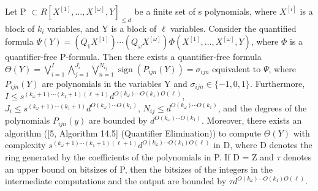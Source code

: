 Let P \(\subset R[X^{[1]},\ldots,X^{[\omega]},Y]_{\le d}\) be a finite set of s polynomials, where \(X^{[i]}\) is a block of \(k_i\) variables, and Y is a block of \(\ell\) variables. Consider the quantified formula \(\Psi(Y)=(Q_1X^{[1]})\cdots(Q_\omega X^{[\omega]})\Phi(X^{[1]},\ldots,X^{[\omega]},Y)\), where \(\Phi\) is a quantifier-free P-formula. Then there exists a quantifier-free formula \(\Theta(Y)=\bigvee_{i=1}^{I}\bigwedge_{j=1}^{J_i}\bigvee_{n=1}^{N_{ij}}\operatorname{sign}(P_{ijn}(Y))=\sigma_{ijn}\) equivalent to \(\Psi\), where \(P_{ijn}(Y)\) are polynomials in the variables Y and \(\sigma_{ijn}\in\{-1,0,1\}\). Furthermore, \(I\le s^{(k_\omega+1)\cdots(k_1+1)(\ell+1)}d^{O(k_\omega)\cdots O(k_1)O(\ell)}\), \(J_i\le s^{(k_\omega+1)\cdots(k_1+1)}d^{O(k_\omega)\cdots O(k_1)}\), \(N_{ij}\le d^{O(k_\omega)\cdots O(k_1)}\), and the degrees of the polynomials \(P_{ijn}(y)\) are bounded by \(d^{O(k_\omega)\cdots O(k_1)}\). Moreover, there exists an algorithm ([5, Algorithm 14.5] (Quantifier Elimination)) to compute \(\Theta(Y)\) with complexity \(s^{(k_\omega+1)\cdots(k_1+1)(\ell+1)}d^{O(k_\omega)\cdots O(k_1)O(\ell)}\) in D, where D denotes the ring generated by the coefficients of the polynomials in P. If D = Z and \(\tau\) denotes an upper bound on bitsizes of P, then the bitsizes of the integers in the intermediate computations and the output are bounded by \(\tau d^{O(k_\omega)\cdots O(k_1)O(\ell)}\).